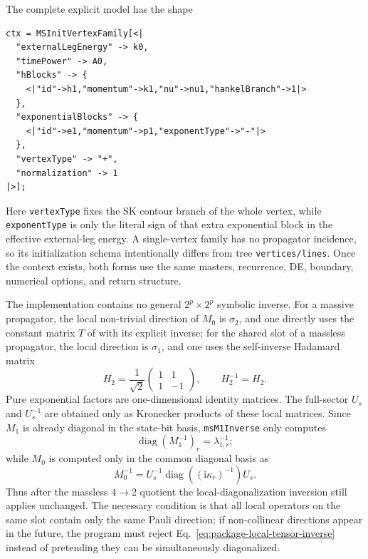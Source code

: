 \documentclass[11pt,a4paper]{article}
\newcommand{\ii}{\mathrm i}
\begin{document}
The complete explicit model has the shape
\begin{verbatim}
ctx = MSInitVertexFamily[<|
  "externalLegEnergy" -> k0,
  "timePower" -> A0,
  "hBlocks" -> {
    <|"id"->h1,"momentum"->k1,"nu"->nu1,"hankelBranch"->1|>
  },
  "exponentialBlocks" -> {
    <|"id"->e1,"momentum"->p1,"exponentType"->"-"|>
  },
  "vertexType" -> "+",
  "normalization" -> 1
|>];
\end{verbatim}
Here \texttt{vertexType} fixes the SK contour branch of the whole vertex, while
\texttt{exponentType} is only the literal sign of that extra exponential block in the effective
external-leg energy. A single-vertex family has no propagator incidence, so its initialization
schema intentionally differs from tree \texttt{vertices/lines}. Once the context exists, both
forms use the same masters, recurrence, DE, boundary, numerical options, and return structure.

The implementation contains no general $2^p\times2^p$ symbolic inverse. For a massive propagator, the local non-trivial direction of $M_0$ is $\sigma_2$, and one directly uses the constant matrix $T$ of \cite{Chen:2023eic} with its explicit inverse; for the shared slot of a massless propagator, the local direction is $\sigma_1$, and one uses the self-inverse Hadamard matrix
\begin{equation}
 H_2=\frac1{\sqrt2}
 \begin{pmatrix}1&1\\1&-1\end{pmatrix},
 \qquad H_2^{-1}=H_2.
 \label{eq:package-hadamard-inverse}
\end{equation}
Pure exponential factors are one-dimensional identity matrices. The full-sector $U_s$ and $U_s^{-1}$ are obtained only as Kronecker products of these local matrices. Since $M_1$ is already diagonal in the state-bit basis, \texttt{msM1Inverse} only computes
\begin{equation}
 \operatorname{diag}(M_1^{-1})_r=\lambda_{1,r}^{-1};
\end{equation}
while $M_0$ is computed only in the common diagonal basis as
\begin{equation}
 M_0^{-1}=U_s^{-1}\operatorname{diag}
 \left((\ii\kappa_r)^{-1}\right)U_s.
 \label{eq:package-local-tensor-inverse}
\end{equation}
Thus after the massless $4\to2$ quotient the local-diagonalization inversion still applies unchanged. The necessary condition is that all local operators on the same slot contain only the same Pauli direction; if non-collinear directions appear in the future, the program must reject Eq.~\eqref{eq:package-local-tensor-inverse} instead of pretending they can be simultaneously diagonalized.
\end{document}
